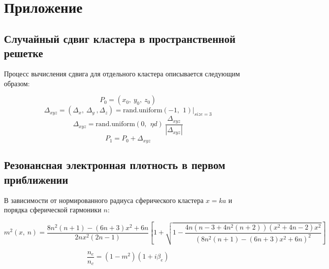 \clearpage
\section*{Приложение}
\subsection*{Случайный сдвиг кластера в пространственной решетке}

Процесс вычисления сдвига для отдельного кластера описывается следующим образом:

    \begin{equation}
        P_0 = (x_0,\:y_0,\:z_0)
        \label{random_shifts}
    \end{equation}
    \begin{equation*}
        \Delta_{xyz} = (\Delta_x,\: \Delta_y\:, \Delta_z) = \textrm{rand.uniform}\left( -1,\:\,1 \right)|_{size=3}
    \end{equation*}
    \begin{equation*}
        \Delta_{xyz} = \textrm{rand.uniform}\left(0,\:\,\eta d \right)\:\frac{\Delta_{xyz}}{|\Delta_{xyz}|}
    \end{equation*}
    \begin{equation*}
        P_1 = P_0 + \Delta_{xyz}
    \end{equation*}

\subsection*{Резонансная электронная плотность в первом приближении}

В зависимости от нормированного радиуса сферического кластера $x = ka$ и порядка сферической гармоники $n$:

\begin{equation}
    m^2 \left(x,\:n \right) = \frac{8n^2 (n + 1) - (6n + 3)x^2 + 6n}{2n x^2 (2n-1)} \left[ 1 + \sqrt{ 1 - \frac{4n (n-3 + 4n^2 (n + 2)) (x^2 + 4n-2) x^2}{{\left(8n^2 (n + 1) - (6n + 3)x^2 + 6n \right)}^{2}} } \right]
    \label{m2_resonance}
\end{equation}

\begin{equation}
    \frac{n_e}{n_c} = (1 - m^2) (1 + i \beta_e)
    \label{nenc_resonance}
\end{equation}
